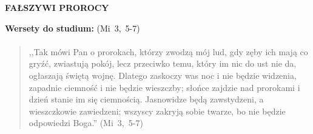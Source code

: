 \documentclass[10pt,a4paper,oneside]{article}
\begin{document}
\centerline{\textbf{\MakeUppercase{Fałszywi prorocy}}}
\begin{center}
\textbf{Wersety do studium:} 
\mbox{(Mi 3, 5-7)}
\end{center}
\paragraph{}
\begin{quote}
,,Tak mówi Pan o prorokach, którzy zwodzą mój lud, gdy zęby ich mają co gryźć, zwiastują pokój, lecz przeciwko temu, który im nic do ust nie da, ogłaszają świętą wojnę. Dlatego zaskoczy was noc i nie będzie widzenia, zapadnie ciemność i nie będzie wieszczby; słońce zajdzie nad prorokami i dzień stanie im się ciemnością. Jasnowidze będą zawstydzeni, a wieszczkowie zawiedzeni; wszyscy zakryją sobie twarze, bo nie będzie odpowiedzi Boga.'' \mbox{(Mi 3, 5-7)}
\end{quote}
\end{document}
